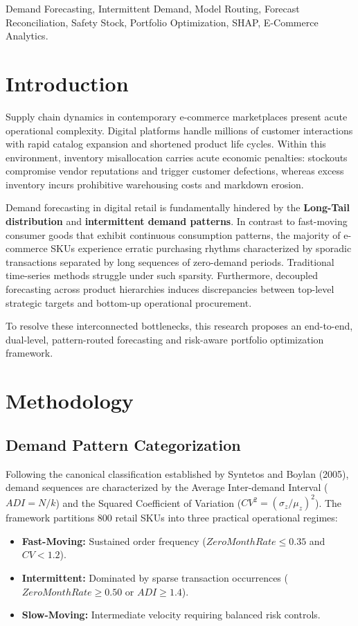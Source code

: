 \documentclass[conference]{IEEEtran}
\begin{document}
\begin{IEEEkeywords}
Demand Forecasting, Intermittent Demand, Model Routing, Forecast Reconciliation, Safety Stock, Portfolio Optimization, SHAP, E-Commerce Analytics.
\end{IEEEkeywords}

\section{Introduction}
Supply chain dynamics in contemporary e-commerce marketplaces present acute operational complexity. Digital platforms handle millions of customer interactions with rapid catalog expansion and shortened product life cycles. Within this environment, inventory misallocation carries acute economic penalties: stockouts compromise vendor reputations and trigger customer defections, whereas excess inventory incurs prohibitive warehousing costs and markdown erosion.

Demand forecasting in digital retail is fundamentally hindered by the \textbf{Long-Tail distribution} and \textbf{intermittent demand patterns}. In contrast to fast-moving consumer goods that exhibit continuous consumption patterns, the majority of e-commerce SKUs experience erratic purchasing rhythms characterized by sporadic transactions separated by long sequences of zero-demand periods. Traditional time-series methods struggle under such sparsity. Furthermore, decoupled forecasting across product hierarchies induces discrepancies between top-level strategic targets and bottom-up operational procurement.

To resolve these interconnected bottlenecks, this research proposes an end-to-end, dual-level, pattern-routed forecasting and risk-aware portfolio optimization framework.

\section{Methodology}

\subsection{Demand Pattern Categorization}
Following the canonical classification established by Syntetos and Boylan (2005), demand sequences are characterized by the Average Inter-demand Interval ($ADI = N/k$) and the Squared Coefficient of Variation ($CV^2 = (\sigma_z / \mu_z)^2$). The framework partitions 800 retail SKUs into three practical operational regimes:
\begin{itemize}
    \item \textbf{Fast-Moving:} Sustained order frequency ($ZeroMonthRate \le 0.35$ and $CV < 1.2$).
    \item \textbf{Intermittent:} Dominated by sparse transaction occurrences ($ZeroMonthRate \ge 0.50$ or $ADI \ge 1.4$).
    \item \textbf{Slow-Moving:} Intermediate velocity requiring balanced risk controls.
\end{itemize}
\end{document}
